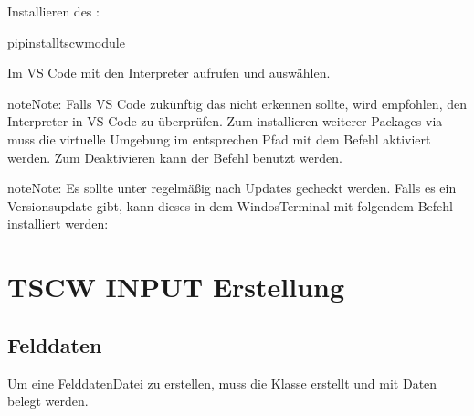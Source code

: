 \documentclass[letterpaper,10pt,english]{sphinxmanual}
\begin{document}
\sphinxAtStartPar
Installieren des :

\begin{sphinxVerbatim}[commandchars=\\\{\}]
\PYGZdl{}pipinstalltscw\PYGZus{}module
\end{sphinxVerbatim}

\sphinxAtStartPar
Im VS Code mit  den Interpreter aufrufen und  auswählen.

\begin{sphinxadmonition}{note}{Note:}
\sphinxAtStartPar
Falls VS Code zukünftig das  nicht erkennen sollte, wird empfohlen, den Interpreter in VS Code zu überprüfen.
Zum installieren weiterer Packages via  muss die virtuelle Umgebung im entsprechen Pfad mit dem Befehl  aktiviert werden.
Zum Deaktivieren kann der Befehl  benutzt werden.
\end{sphinxadmonition}

\begin{sphinxadmonition}{note}{Note:}
\sphinxAtStartPar
Es sollte unter   regelmäßig nach Updates gecheckt werden.
Falls es ein Versionsupdate gibt, kann dieses in dem Windos\sphinxhyphen{}Terminal mit folgendem Befehl installiert werden:

\sphinxAtStartPar
{}

\sphinxAtStartPar
{}
\end{sphinxadmonition}

\sphinxstepscope


\chapter{TSCW \sphinxhyphen{} INPUT \sphinxhyphen{} Erstellung}
\label{\detokenize{source/Input:tscw-input-erstellung}}\label{\detokenize{source/Input::doc}}

\section{Felddaten}
\label{\detokenize{source/Input:felddaten}}
\sphinxAtStartPar
Um eine Felddaten\sphinxhyphen{}Datei zu erstellen, muss die Klasse  erstellt und mit Daten belegt werden.
\end{document}
